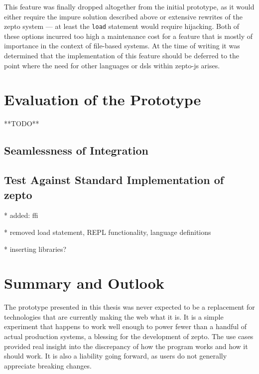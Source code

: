 \documentclass[oneside,11pt,xetex]{scrbook}
\begin{document}
This feature was finally dropped altogether from the initial prototype,
as it would either require the impure solution described above or extensive rewrites
of the zepto system --- at least the \texttt{load} statement would require hijacking.
Both of these options incurred too high a maintenance cost for a feature that is
mostly of importance in the context of file-based systems. At the time of writing it
was determined that the implementation of this feature should be deferred to the point
where the need for other languages or \glspl{dsl} within zepto-js arises.

\chapter{Evaluation of the Prototype}
\label{chap:evaluation}

**TODO**

\section{Seamlessness of Integration}

\section{Test Against Standard Implementation of zepto}

* added: ffi

* removed load statement, REPL functionality, language definitions

* inserting libraries?

\chapter{Summary and Outlook}
\label{chap:outlook}

The prototype presented in this thesis was never expected to be a replacement
for technologies that are currently making the web what it is. It is a simple
experiment that happens to work well enough to power fewer than a handful of
actual production systems, a blessing for the development of zepto. The
use cases provided real insight into the discrepancy of how the program
works and how it should work. It is also a liability going forward, as users
do not generally appreciate breaking changes.
\end{document}
